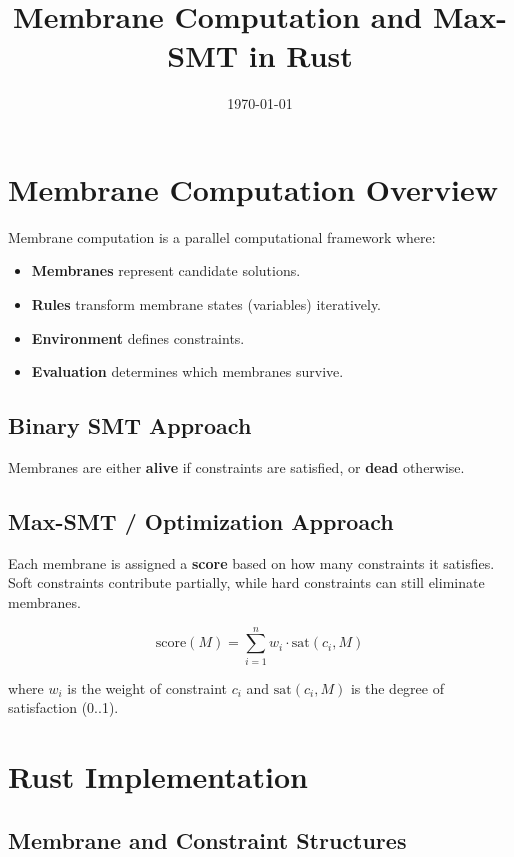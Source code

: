 \documentclass[12pt]{article}
\title{Membrane Computation and Max-SMT in Rust}
\author{}
\date{\today}
\begin{document}
\maketitle

\tableofcontents
\newpage

\section{Membrane Computation Overview}

Membrane computation is a parallel computational framework where:

\begin{itemize}
    \item \textbf{Membranes} represent candidate solutions.
    \item \textbf{Rules} transform membrane states (variables) iteratively.
    \item \textbf{Environment} defines constraints.
    \item \textbf{Evaluation} determines which membranes survive.
\end{itemize}

\subsection{Binary SMT Approach}
Membranes are either \textbf{alive} if constraints are satisfied, or \textbf{dead} otherwise.

\subsection{Max-SMT / Optimization Approach}
Each membrane is assigned a \textbf{score} based on how many constraints it satisfies.
Soft constraints contribute partially, while hard constraints can still eliminate membranes.

\[
\text{score}(M) = \sum_{i=1}^{n} w_i \cdot \text{sat}(c_i, M)
\]

where \(w_i\) is the weight of constraint \(c_i\) and \(\text{sat}(c_i, M)\) is the degree of satisfaction (0..1).

\section{Rust Implementation}

\subsection{Membrane and Constraint Structures}
\end{document}
